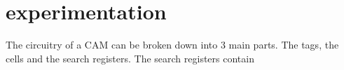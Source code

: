 \section{experimentation}
The circuitry of a CAM can be broken down into 3 main parts. The tags, the cells and the search registers. The search registers contain